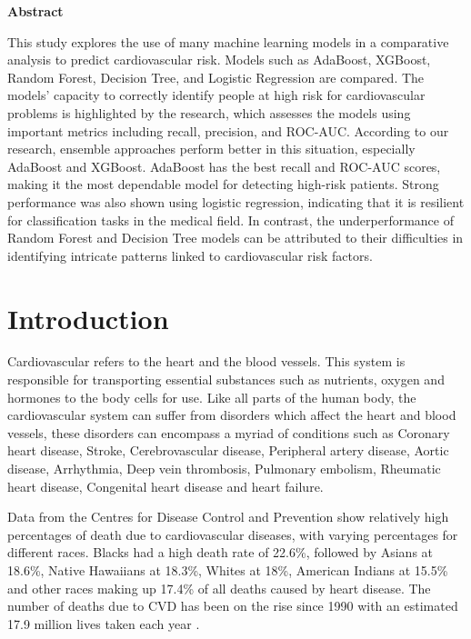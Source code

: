 \documentclass[12pt, a4paper,twoside]{report}
\numberwithin{equation}{chapter}
\begin{document}
\begin{center}
    \newpage
    \vspace{0.9cm}
    \Large \bf{Abstract}
\end{center}

This study explores the use of many machine learning models in a comparative analysis to predict cardiovascular risk. Models such as AdaBoost, XGBoost, Random Forest, Decision Tree, and Logistic Regression are compared. The models' capacity to correctly identify people at high risk for cardiovascular problems is highlighted by the research, which assesses the models using important metrics including recall, precision, and ROC-AUC. According to our research, ensemble approaches perform better in this situation, especially AdaBoost and XGBoost. AdaBoost has the best recall and ROC-AUC scores, making it the most dependable model for detecting high-risk patients. Strong performance was also shown using logistic regression, indicating that it is resilient for classification tasks in the medical field. In contrast, the underperformance of Random Forest and Decision Tree models can be attributed to their difficulties in identifying intricate patterns linked to cardiovascular risk factors.

\chapter{Introduction}\label{ch:1}


Cardiovascular refers to the heart and the blood vessels. This system is responsible for transporting essential substances such as nutrients, oxygen and hormones to the body cells for use. Like all parts of the human body, the cardiovascular system can suffer from disorders which affect the heart and blood vessels, these disorders can encompass a myriad of conditions such as Coronary heart disease, Stroke, Cerebrovascular disease, Peripheral artery disease, Aortic disease, Arrhythmia, Deep vein thrombosis, Pulmonary embolism, Rheumatic heart disease, Congenital heart disease and heart failure\parencite{cambridge}.

Data from the Centres for Disease Control and Prevention \parencite{cdc} show relatively high percentages of death due to cardiovascular diseases, with varying percentages for different races. Blacks had a high death rate of 22.6\%, followed by Asians at 18.6\%, Native Hawaiians at 18.3\%, Whites at 18\%, American Indians at 15.5\% and other races making up 17.4\% of all deaths caused by heart disease. The number of deaths due to CVD has been on the rise since 1990 with an estimated 17.9 million lives taken each year \parencite{WHO_2019}.
\end{document}
